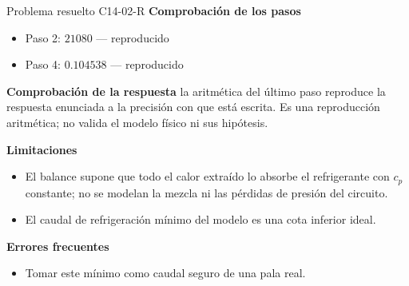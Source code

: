 \documentclass[10pt,openany]{book}
\begin{document}
\begin{studiumworked}{Problema resuelto C14-02-R}
\noindent\textbf{Comprobación de los pasos}
\begin{itemize}
\item Paso 2: $21080$ — reproducido
\item Paso 4: $0.104538$ — reproducido
\end{itemize}

\noindent\textbf{Comprobación de la respuesta} la aritmética del último paso reproduce la respuesta enunciada a la precisión con que está escrita. Es una reproducción aritmética; no valida el modelo físico ni sus hipótesis.

\noindent\textbf{Limitaciones}
\begin{itemize}
\item El balance supone que todo el calor extraído lo absorbe el refrigerante con $c_p$ constante; no se modelan la mezcla ni las pérdidas de presión del circuito.
\item El caudal de refrigeración mínimo del modelo es una cota inferior ideal.
\end{itemize}

\noindent\textbf{Errores frecuentes}
\begin{itemize}
\item Tomar este mínimo como caudal seguro de una pala real.
\end{itemize}
\end{studiumworked}
\end{document}
